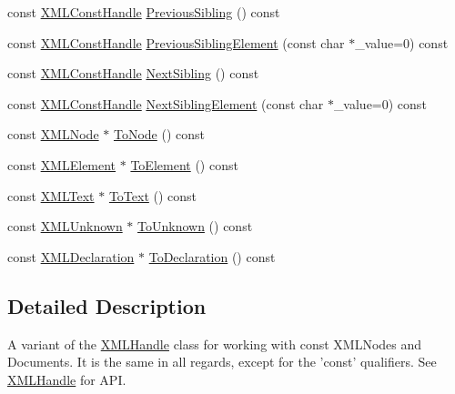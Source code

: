 \begin{DoxyCompactItemize}
\item 
const \hyperlink{classtinyxml2_1_1_x_m_l_const_handle}{X\+M\+L\+Const\+Handle} \hyperlink{classtinyxml2_1_1_x_m_l_const_handle_a6917564e26b2c20ebdcb23c7940ad80a}{Previous\+Sibling} () const 
\item 
const \hyperlink{classtinyxml2_1_1_x_m_l_const_handle}{X\+M\+L\+Const\+Handle} \hyperlink{classtinyxml2_1_1_x_m_l_const_handle_acb2e1c5762eff9f6ed72d1a2dfc14271}{Previous\+Sibling\+Element} (const char $\ast$\+\_\+value=0) const 
\item 
const \hyperlink{classtinyxml2_1_1_x_m_l_const_handle}{X\+M\+L\+Const\+Handle} \hyperlink{classtinyxml2_1_1_x_m_l_const_handle_a596e248c8014d718f41658502a2e221b}{Next\+Sibling} () const 
\item 
const \hyperlink{classtinyxml2_1_1_x_m_l_const_handle}{X\+M\+L\+Const\+Handle} \hyperlink{classtinyxml2_1_1_x_m_l_const_handle_a3bbdd3d866c750473bd69a232704503b}{Next\+Sibling\+Element} (const char $\ast$\+\_\+value=0) const 
\item 
const \hyperlink{classtinyxml2_1_1_x_m_l_node}{X\+M\+L\+Node} $\ast$ \hyperlink{classtinyxml2_1_1_x_m_l_const_handle_a95d0256318c10c3f75fa5f8ffb3e4bc1}{To\+Node} () const 
\item 
const \hyperlink{classtinyxml2_1_1_x_m_l_element}{X\+M\+L\+Element} $\ast$ \hyperlink{classtinyxml2_1_1_x_m_l_const_handle_a5a48adefc2a5e70d4ce5b55692a0e2f9}{To\+Element} () const 
\item 
const \hyperlink{classtinyxml2_1_1_x_m_l_text}{X\+M\+L\+Text} $\ast$ \hyperlink{classtinyxml2_1_1_x_m_l_const_handle_ad86ca7dbb20d0495ae357fe7a866e0be}{To\+Text} () const 
\item 
const \hyperlink{classtinyxml2_1_1_x_m_l_unknown}{X\+M\+L\+Unknown} $\ast$ \hyperlink{classtinyxml2_1_1_x_m_l_const_handle_acb358a329e54fa204ed2d0b181566828}{To\+Unknown} () const 
\item 
const \hyperlink{classtinyxml2_1_1_x_m_l_declaration}{X\+M\+L\+Declaration} $\ast$ \hyperlink{classtinyxml2_1_1_x_m_l_const_handle_a5de0c175845bc30a6f9b3d88d8877eaf}{To\+Declaration} () const 
\end{DoxyCompactItemize}


\subsection{Detailed Description}
A variant of the \hyperlink{classtinyxml2_1_1_x_m_l_handle}{X\+M\+L\+Handle} class for working with const X\+M\+L\+Nodes and Documents. It is the same in all regards, except for the 'const' qualifiers. See \hyperlink{classtinyxml2_1_1_x_m_l_handle}{X\+M\+L\+Handle} for A\+P\+I. 

